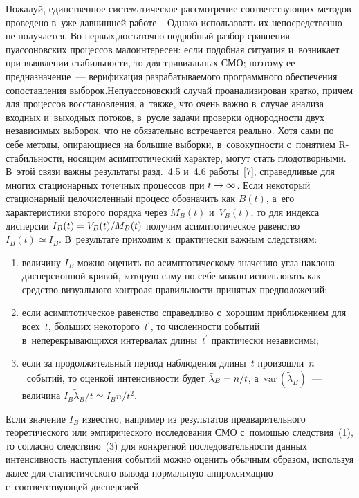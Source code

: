 \begin{multicols}{2}
     Пожалуй, единственное систематическое рассмотрение со\-от\-вет\-ст\-ву\-ющих 
методов проведено в~уже дав\-ниш\-ней работе~\cite{7-kri}. Однако использовать их 
непосредственно не получается. Во-пер\-вых,\linebreak достаточно подробный разбор 
сравнения пуассоновских процессов малоинтересен: если подобная ситуация 
и~возникает при выявлении ста\-биль\-ности, то для тривиальных СМО; поэтому ее 
предназначение~--- верификация раз\-ра\-ба\-ты\-ва\-емо\-го программного обеспечения 
со\-по\-став\-ле\-ния выборок.\linebreak Непуассоновский случай проанализирован кратко, 
причем для процессов восстановления, а~так\-же, что очень важ\-но в~случае анализа 
входных и~выходных потоков, в~рус\-ле задачи проверки од\-но\-род\-ности двух 
независимых выборок, что не обязательно встречается реально. Хотя сами по себе 
методы, опи\-ра\-ющи\-еся на большие выборки, в~совокупности с~понятием  
R-ста\-биль\-ности, носящим асимптотический характер, могут стать 
пло\-до\-твор\-ны\-ми. В~этой связи важны результаты разд.~4.5 и~4.6 работы~[7], 
справедливые для многих стационарных точечных процессов при $t\hm\to \infty$. 
Если некоторый стационарный целочисленный процесс обозначить как $B(t)$, 
а~его характеристики второго порядка через $M_B(t)$ и~$V_B(t)$, то для индекса 
дисперсии $I_B(t)\hm= V_B(t)/M_B(t)$ получим асимптотическое равенство 
$I_B(t)\simeq I_B$. В~результате приходим к~практически важ\-ным следствиям:

\noindent
     \begin{enumerate}[(1)]
\item величину $I_B$ можно оценить по асимптотическому значению угла 
наклона дисперсионной кривой, которую саму по себе можно использовать как 
средство визуального контроля пра\-виль\-ности принятых предположений;
\item если асимптотическое равенство справедливо с~хорошим приближением для 
всех~$t$, б$\acute{\mbox{о}}$льших некоторого~$t^\prime$, то численности 
событий в~не\-пе\-ре\-кры\-ва\-ющих\-ся интервалах длины~$t^\prime$ практически 
независимы;
\item если за продолжительный период наблюдения длины~$t$ 
произошли~$n$~событий, то оценкой ин\-тен\-сив\-ности будет $\tilde{\lambda}_B\hm= 
n/t$, а~$\mathrm{var}\,(\tilde{\lambda}_B)$~--- величина 
$I_B\tilde{\lambda}_B/t\simeq I_B n/t^2$. 
     \end{enumerate}
     
     Если значение $I_B$ известно, например из результатов предварительного 
теоретического или эмпирического исследования СМО с~по\-мощью следствия~(1), 
то согласно следствию~(3) для конкретной последовательности данных 
ин\-тен\-сив\-ность на\-ступ\-ле\-ния событий можно оценить обычным образом, используя 
далее для статистического вывода нормальную аппроксимацию 
с~со\-от\-вет\-ст\-ву\-ющей дисперсией.
     

\end{multicols}
